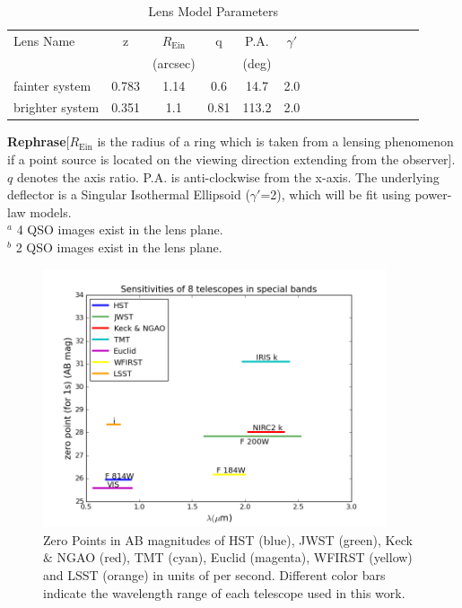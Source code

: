\documentclass[a4paper,11pt]{article}
\begin{document}
\begin{table}\footnotesize
\begin{center}
\caption{Lens Model Parameters}
\begin{tabular}{lcccccccccccccc|}
\hline \hline
Lens Name & z & $R_\textrm{Ein}$ & q & P.A. & $\gamma'$\\
& & (arcsec) & & (deg) \\
\hline
fainter system & 0.783 & 1.14   &   0.6  &   14.7  &  2.0 \\
brighter system & 0.351 &  1.1    &   0.81  &   113.2  &  2.0 \\
\hline
\hline
\end{tabular}
\begin{tablenotes}
\item 
\textbf{Rephrase}[$R_\textrm{Ein}$ is the radius of a ring which is taken from a lensing phenomenon if a point source is located on the viewing direction extending from the observer]. $q$ denotes the axis ratio. P.A. is anti-clockwise from the x-axis. The underlying deflector is a Singular Isothermal Ellipsoid ($\gamma'$=2), which will be fit using power-law models.\\
$^a$ 4 QSO images exist in the lens plane. \\
$^b$ 2 QSO images exist in the lens plane. \\
\label{tab:lenspars}
\end{tablenotes}
\end{center}
\end{table}

\begin{figure}
\begin{center}
\includegraphics[width=0.9\textwidth]{wavelength_zp.png}
\end{center}
\caption{Zero Points in AB magnitudes of HST (blue), JWST (green), Keck $\&$ NGAO (red), TMT (cyan), Euclid (magenta), WFIRST (yellow) and LSST (orange) in units of per second. Different color bars indicate the wavelength range of each telescope used in this work.}
\label{fig:zp_wavelength}
\end{figure}
\end{document}

